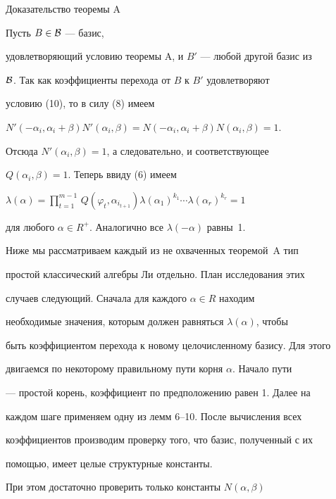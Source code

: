 \begin{pf*}{Доказательство теоремы A}


Пусть $B\in\cal B$ --- базис,


удовлетворяющий условию теоремы A, и $B'$ --- любой другой базис из


$\cal B$. Так как коэффициенты перехода от $B$ к $B'$ удовлетворяют


условию (10), то в силу (8) имеем


$N'(-\alpha_i,\alpha_i+\beta)N'(\alpha_i,\beta)=


N(-\alpha_i,\alpha_i+\beta)N(\alpha_i,\beta)=1$.


Отсюда $N'(\alpha_i,\beta)=1$, а следовательно, и соответствующее


$Q(\alpha_i,\beta)=1$. Теперь ввиду (6) имеем


$\lambda(\alpha)=\prod\limits_{t=1}^{m-1}\,Q(\varphi_t,\alpha_{i_{t+1}})


\lambda(\alpha_1)^{k_1}\dotsb\lambda(\alpha_r)^{k_r}=1$


для любого $\alpha\in R^+$. Аналогично все $\lambda(-\alpha)$ равны~1.


\end{pf*}





Ниже мы рассматриваем каждый из не охваченных теоремой~A тип


простой классический алгебры Ли отдельно. План исследования этих


случаев следующий. Сначала для каждого $\alpha\in R$ находим


необходимые значения, которым должен равняться $\lambda(\alpha)$, чтобы


быть коэффициентом перехода к новому целочисленному базису. Для этого


двигаемся по некоторому правильному пути корня $\alpha$. Начало пути


--- простой корень, коэффициент по предположению равен 1. Далее на


каждом шаге применяем одну из лемм 6--10. После вычисления всех


коэффициентов производим проверку того, что базис, полученный с их


помощью, имеет целые структурные константы.





При этом достаточно проверить только константы $N(\alpha,\beta)$


